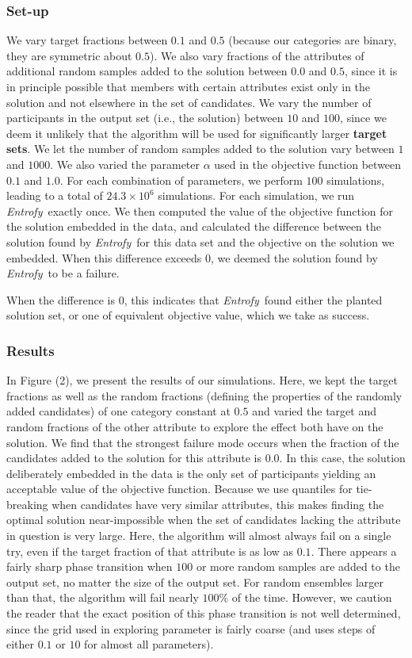 \documentclass[12pt]{article}
\newcommand{\project}[1]{\textsl{#1}}
\newcommand{\entrofy}{\project{Entrofy}}
\begin{document}
\subsubsection*{Set-up}
We vary target fractions between $0.1$ and $0.5$ (because our categories are binary, they are symmetric about $0.5$). We also vary fractions of the attributes of additional random samples added to the solution between $0.0$ and $0.5$, since it is in principle possible that members with certain attributes exist only in the solution and not elsewhere in the set of candidates. We vary the number of participants in the output set (i.e., the solution) between $10$ and $100$, since we deem it unlikely that the algorithm will be used for significantly larger \textbf{target sets}. We let the number of random samples added to the solution vary between $1$ and $1000$. We also varied the parameter $\alpha$ used in the objective function between $0.1$ and $1.0$. For each combination of parameters, we perform $100$ simulations, leading to a total of $24.3 \times 10^{6}$ simulations. 
For each simulation, we run \entrofy\ exactly once. We then computed the value of the objective function for the solution embedded in the data, and calculated the difference between the solution found by \entrofy\ for this data set and the objective on the solution we embedded. When this difference exceeds $0$, we deemed the solution found by \entrofy\ to be a failure.
\begin{bf}
When the difference is 0, this indicates that \entrofy\ found either the planted solution set, or one of equivalent objective value, which we take as success.
\end{bf}

\subsubsection*{Results}
In Figure (2), we present the results of our simulations. Here, we kept the target fractions as well as the random fractions (defining the properties of the randomly added candidates) of one category constant at $0.5$ and varied the target and random fractions of the other attribute to explore the effect both have on the solution. We find that the strongest failure mode occurs when the fraction of the candidates added to the solution for this attribute is $0.0$. In this case, the solution deliberately embedded in the data is the only set of participants yielding an acceptable value of the objective function. Because we use quantiles for tie-breaking when candidates have very similar attributes, this makes finding the optimal solution near-impossible when the set of candidates lacking the attribute in question is very large. Here, the algorithm will almost always fail on a single try, even if the target fraction of that attribute is as low as $0.1$. There appears a fairly sharp phase transition when $100$ or more random samples are added to the output set, no matter the size of the output set. For random ensembles larger than that, the algorithm will fail nearly $100\%$ of the time. However, we caution the reader that the exact position of this phase transition is not well determined, since the grid used in exploring parameter is fairly coarse (and uses steps of either $0.1$ or $10$ for almost all parameters). 
\end{document}
